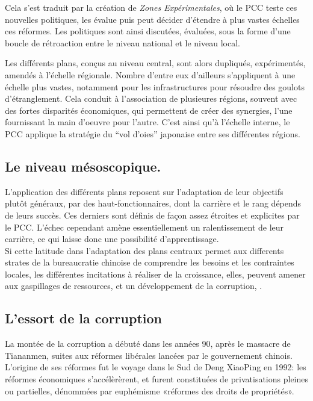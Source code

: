 \documentclass[a4paper]{article}
\begin{document}
Cela s’est traduit par la création de \emph{Zones Expérimentales}, où le PCC teste ces
nouvelles politiques, les évalue puis peut décider d’étendre à plus vastes
échelles ces réformes. Les politiques sont ainsi discutées, évaluées, sous la
forme d’une boucle de rétroaction entre le niveau national et le niveau local.

Les différents plans, conçus au niveau central, sont alors dupliqués,
expérimentés, amendés à l’échelle régionale. Nombre d’entre eux d’ailleurs
s’appliquent à une échelle plus vastes, notamment pour les infrastructures pour
résoudre des goulots d’étranglement. Cela conduit à l’association de plusieures
régions, souvent avec des fortes disparités économiques, qui permettent de créer
des synergies, l’une fournissant la main d’oeuvre pour l’autre. C’est ainsi qu’à
l’échelle interne, le PCC applique la stratégie du “vol d’oies” japonaise entre
ses différentes régions.
\subsection{Le niveau mésoscopique.}
\label{sec:orgc8b3031}
L’application des différents plans reposent sur l’adaptation de leur objectifs
plutôt généraux, par des haut-fonctionnaires, dont la carrière et le rang
dépends de leurs succès. Ces derniers sont définis de façon assez étroites et
explicites par le PCC. L’échec cependant amène essentiellement un ralentissement
de leur carrière, ce qui laisse donc une possibilité d’apprentissage.\\

 Si cette latitude dans l’adaptation des plans centraux permet aux differents
strates de la bureaucratie chinoise de comprendre les besoins et les contraintes
locales, les différentes incitations à réaliser de la croissance, elles, peuvent
amener aux gaspillages de ressources, et un développement de la corruption,
\cite{ang16_how_china}.
\subsection{L’essort de la corruption}
\label{sec:orga8aaf5f}
La montée de la corruption a débuté dans les années 90, après le massacre de
Tiananmen, suites aux réformes libérales lancées par le gouvernement chinois.
L’origine de ses réformes fut le voyage dans le Sud de Deng XiaoPing en 1992:
les réformes économiques s'accélèrèrent, et furent constituées de privatisations
pleines ou partielles, dénommées par euphémisme «réformes des droits de
propriétés».
\end{document}
